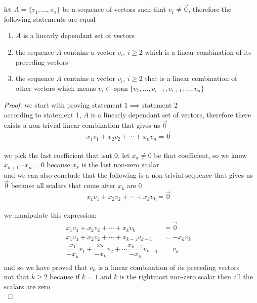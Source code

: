 \documentclass[a4paper,12pt]{article}
\DeclareMathOperator{\spn}{span}
\begin{document}
\begin{definition}
\begin{lemma}
let \(A = \{v_1,\ldots,v_n\}\) be a sequence of vectors such that \(v_1 \neq \vec0\), therefore the following statements are equal\\
\begin{enumerate}
\item \(A\) is a linearly dependant set of vectors\\
\item the sequence \(A\) contains a vector \(v_i,\ i \geq 2\) which is a linear combination of its preceding vectors\\
\item the sequence \(A\) contains a vector \(v_i,\ i \geq 2\) that is a linear combination of other vectors which means \(v_i \in \spn\{v_1,\ldots,v_{i-1},v_{i+1},\ldots,v_n\}\)\\
\end{enumerate}
\begin{proof}
we start with proving \(\text{statement } 1 \implies \text{statement } 2\)\\
according to statement 1, \(A\) is a linearly dependant set of vectors, therefore there exists a non-trivial linear combination that gives us \(\vec0\)\\
\[
  x_1v_1 + x_2v_2 + \cdots + x_nv_n = \vec0
\]\\
we pick the last coefficient that isnt 0, let \(x_k \neq 0\) be that coefficient, so we know \(x_{k+1} \cdots x_n = 0\) because \(x_k\) is the last non-zero scalar\\
and we can also conclude that the following is a non-trivial sequence that gives us \(\vec0\) because all scalars that come after \(x_k\) are \(0\)\\
\[
  x_1v_1 + x_2v_2 + \cdots + x_kv_k = \vec0
\]\\
we manipulate this expression:\\
\begin{align*}
  x_1v_1 + x_2v_2 + \cdots + x_kv_k &= \vec0\\
  x_1v_1 + x_2v_2 + \cdots + x_{k-1}v_{k-1} &= -x_kv_k\\
  \dfrac{x_1}{-x_k}v_1 + \dfrac{x_2}{-x_k}v_2 + \cdots \dfrac{x_{k-1}}{-x_k}v_{k-1} &= v_k\\
\end{align*}
and so we have proved that \(v_k\) is a linear combination of its preceding vectors\\
not that \(k \geq 2\) because if \(k = 1\) and \(k\) is the rightmost non-zero scalar then all the scalars are zero\\
\end{proof}


\end{lemma}
\end{definition}
\end{document}
